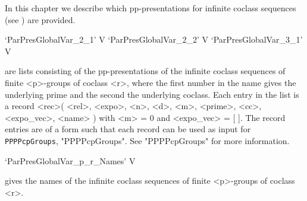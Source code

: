 

In this chapter we describe which pp-presentations for infinite
coclass sequences (see \cite{ELG08}) are provided. 


\>`ParPresGlobalVar_2_1' V
\>`ParPresGlobalVar_2_2' V
\>`ParPresGlobalVar_3_1' V

are lists consisting of the pp-presentations of the infinite 
coclass sequences of finite <p>-groups of coclass <r>, where the first number
in the name gives the underlying prime and the second the underlying coclass. 
Each entry in the list is a record 
<rec>( <rel>, <expo>, <n>, <d>, <m>, <prime>, <cc>, <expo_vec>, <name> )
with <m> = 0 and <expo_vec> = [ ]. The record entries are of a form such that 
each record can be used as input for 
{\tt PPPPcpGroups},
"PPPPcpGroups". See "PPPPcpGroups" for more information.

\>`ParPresGlobalVar_p_r_Names' V 

gives the names of the infinite coclass sequences of finite <p>-groups of
coclass <r>. 

%


